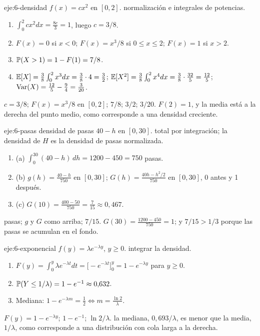 \begin{solucion}{eje:6-densidad}
\datos $f(x)=cx^{2}$ en $[0,2]$.
\planteamiento normalización e integrales de potencias.
\pasos
\begin{enumerate}[label=\arabic*.]
  \item $\int_0^2cx^{2}dx=\frac{8c}3=1$, luego $c=3/8$.
  \item $F(x)=0$ si $x<0$; $F(x)=x^{3}/8$ si $0\le x\le2$; $F(x)=1$ si $x>2$.
  \item $\mathbb{P}(X>1)=1-F(1)=7/8$.
  \item $\mathbb{E}[X]=\frac38\int_0^2x^{3}dx=\frac38\cdot4=\frac32$; $\mathbb{E}[X^{2}]=\frac38\int_0^2x^{4}dx=\frac38\cdot\frac{32}5=\frac{12}5$; $\operatorname{Var}(X)=\frac{12}5-\frac94=\frac3{20}$.
\end{enumerate}
\resultado $c=3/8$; $F(x)=x^{3}/8$ en $[0,2]$; $7/8$; $3/2$; $3/20$.
\comprobacion $F(2)=1$, y la media está a la derecha del punto medio, como corresponde a una densidad creciente.
\end{solucion}

\begin{solucion}{eje:6-pasas}
\datos densidad de pasas $40-h$ en $[0,30]$.
\planteamiento total por integración; la densidad de $H$ es la densidad de pasas normalizada.
\pasos
\begin{enumerate}[label=\arabic*.]
  \item (a) $\int_0^{30}(40-h)\,dh=1200-450=750$ pasas.
  \item (b) $g(h)=\frac{40-h}{750}$ en $[0,30]$; $G(h)=\frac{40h-h^{2}/2}{750}$ en $[0,30]$, 0 antes y 1 después.
  \item (c) $G(10)=\frac{400-50}{750}=\frac7{15}\approx0{,}467$.
\end{enumerate}
 pasas; $g$ y $G$ como arriba; $7/15$.
\comprobacion $G(30)=\frac{1200-450}{750}=1$; y $7/15>1/3$ porque las pasas se acumulan en el fondo.
\end{solucion}

\begin{solucion}{eje:6-exponencial}
\datos $f(y)=\lambda e^{-\lambda y}$, $y\ge0$.
\planteamiento integrar la densidad.
\pasos
\begin{enumerate}[label=\arabic*.]
  \item $F(y)=\int_0^y\lambda e^{-\lambda t}dt=\bigl[-e^{-\lambda t}\bigr]_0^y=1-e^{-\lambda y}$ para $y\ge0$.
  \item $\mathbb{P}(Y\le1/\lambda)=1-e^{-1}\approx0{,}632$.
  \item Mediana: $1-e^{-\lambda m}=\frac12\iff m=\frac{\ln2}\lambda$.
\end{enumerate}
\resultado $F(y)=1-e^{-\lambda y}$; $1-e^{-1}$; $\ln2/\lambda$.
\comprobacion la mediana, $0{,}693/\lambda$, es menor que la media, $1/\lambda$, como corresponde a una distribución con cola larga a la derecha.
\end{solucion}


